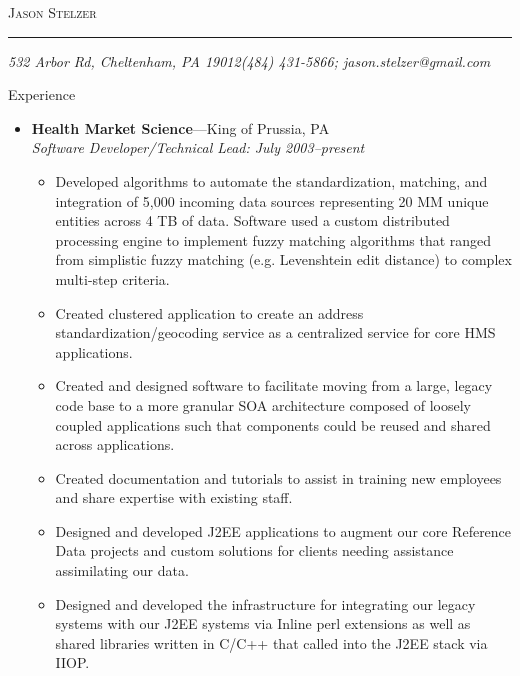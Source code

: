 \documentclass[11pt,oneside]{article}
\makeatletter
\newcommand{\name}{Jason Stelzer}
\newcommand{\addr}{532 Arbor Rd, Cheltenham, PA 19012}
\newcommand{\phone}{(484) 431-5866}
\newcommand{\email}{jason.stelzer@gmail.com}
\newcommand{\bigname}[1]{
	\begin{center}\fontfamily{phv}\selectfont\Huge\scshape#1\end{center}
}
\newenvironment{ressection}[1]{
	\vspace{4pt}
	{\fontfamily{phv}\selectfont\Large#1}
	\begin{itemize}
	\vspace{3pt}
}{
	\end{itemize}
}
\newcommand{\ressubitem}[1]{
	\vspace{-1pt}
	\item \begin{flushleft} #1 \end{flushleft}
}
\newcommand{\resbigitem}[3]{
	\vspace{-5pt}
	\item
	\textbf{#1}---#2 \\
	\textit{#3}
}
\newenvironment{ressubsec}[3]{
	\resbigitem{#1}{#2}{#3}
	\vspace{-2pt}
	\begin{itemize}
}{
	\end{itemize}
}
\makeatother
\begin{document}
 \selectfont

\bigname{\name}

\vspace{-8pt} \rule{\textwidth}{1pt}

\vspace{-1pt} {\small\itshape \addr \hfill \phone; \email}

\vspace{8 pt}

\begin{ressection}{Experience}

	\begin{ressubsec}{Health Market Science}{King of Prussia, PA}{Software Developer/Technical Lead: July 2003--present}

	  \ressubitem{Developed algorithms to automate the
            standardization, matching, and integration of 5,000
            incoming data sources representing 20 MM unique entities
            across 4 TB of data.  Software used a custom distributed
            processing engine to implement fuzzy matching algorithms
            that ranged from simplistic fuzzy matching
            (e.g. Levenshtein edit distance) to complex multi-step
            criteria. }

	  \ressubitem{Created clustered application to create an
            address standardization/geocoding service as a centralized
            service for core HMS applications.}

	  \ressubitem{Created and designed software to facilitate
            moving from a large, legacy code base to a more granular
            SOA architecture composed of loosely coupled applications
            such that components could be reused and shared across
            applications.}

	  \ressubitem{Created documentation and tutorials to assist in
            training new employees and share expertise with existing
            staff.}

	  \ressubitem{Designed and developed J2EE applications to
            augment our core Reference Data projects and custom
            solutions for clients needing assistance assimilating our
            data.}

	  \ressubitem{Designed and developed the infrastructure for
            integrating our legacy systems with our J2EE systems via
            Inline perl extensions as well as shared libraries written
            in C/C++ that called into the J2EE stack via IIOP.}


\end{ressubsec}
\end{ressection}
\end{document}

